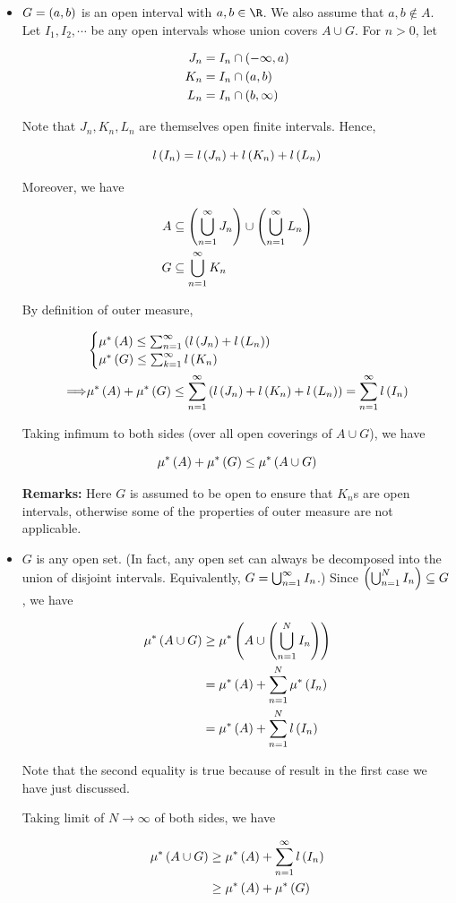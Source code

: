 \documentclass[
]{article}
\begin{document}
\begin{itemize}
\item
  \(G = \pr{a,b}\) is an open interval with \(a,b\in \R\). We also
  assume that \(a,b\notin A\). Let \(I_1,I_2,\cdots\) be any open
  intervals whose union covers \(A\cup G\). For \(n>0\), let

  \[\ba
  J_n & = I_n\cap \pr{-\infty,a}\\
  K_n & = I_n\cap \pr{a,b}\\
  L_n & = I_n\cap \pr{b,\infty}
  \ea\]

  Note that \(J_n,K_n,L_n\) are themselves open finite intervals. Hence,

  \[l\pr{I_n} = l\pr{J_n} + l\pr{K_n}+l\pr{L_n}\]

  Moreover, we have

  \[\ba
  A& \se \pr{\uinf[n]J_n}\cup \pr{\uinf[n]L_n}\\
  G& \se \uinf[n]K_n
  \ea\]

  By definition of outer measure,

  \[\ba
  & \bc
  \mu^*\pr{A}\le \sinf[n]\pr{l\pr{J_n}+l\pr{L_n}}\\
  \mu^*\pr{G}\le \sinf l\pr{K_n}\\
  \ec\\
  \too & \mu^*\pr{A}+\mu^*\pr{G} \le \sinf[n]\pr{l\pr{J_n}+l\pr{K_n}+ l\pr{L_n}}= \sinf[n]l\pr{I_n}
  \ea\]

  Taking infimum to both sides (over all open coverings of \(A\cup G\)),
  we have

  \[\mu^*\pr{A}+\mu^*\pr{G}\le \mu^*\pr{A\cup G}\]

  \textbf{Remarks:} Here \(G\) is assumed to be open to ensure that
  \(K_n\)\textquotesingle s are open intervals, otherwise some of the
  properties of outer measure are not applicable.
\item
  \(G\) is any open set. (In fact, any open set can always be decomposed
  into the union of disjoint intervals. Equivalently,
  \(G = \uinf[n] I_n\).) Since \(\pr{\bigcup_{n = 1}^N I_n}\se G\), we
  have

  \[\ba
  \mu^*\pr{A\cup G}& \ge \mu^*\pr{A\cup \pr{\bigcup_{n = 1}^N I_n}}\\
  & = \mu^*\pr{A} + \sum_{n = 1}^N\mu^*\pr{I_n}\\
  & = \mu^*\pr{A} + \sum_{n = 1}^Nl\pr{I_n}
  \ea\]

  Note that the second equality is true because of result in the first
  case we have just discussed.

  Taking limit of \(N\to \infty\) of both sides, we have

  \[\ba
  \mu^*\pr{A\cup G}&\ge \mu^*\pr{A}+\sinf[n]l\pr{I_n}\\
  & \ge \mu^*\pr{A}+\mu^*\pr{G}
  \ea\]
\end{itemize}
\end{document}
